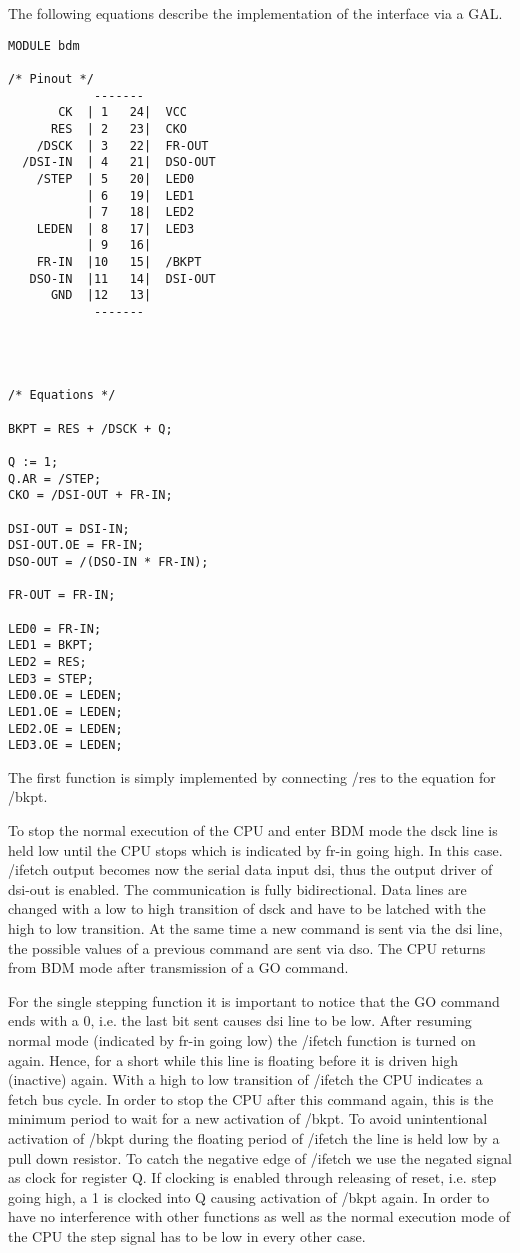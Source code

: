 \documentclass[12pt]{article}
\begin{document}
The following equations describe the implementation of the interface
via a GAL.

\small
\begin{verbatim}
MODULE bdm

/* Pinout */
            -------
       CK  | 1   24|  VCC
      RES  | 2   23|  CKO
    /DSCK  | 3   22|  FR-OUT
  /DSI-IN  | 4   21|  DSO-OUT
    /STEP  | 5   20|  LED0
           | 6   19|  LED1
           | 7   18|  LED2
    LEDEN  | 8   17|  LED3
           | 9   16|
    FR-IN  |10   15|  /BKPT
   DSO-IN  |11   14|  DSI-OUT
      GND  |12   13|
            -------




/* Equations */

BKPT = RES + /DSCK + Q;

Q := 1;
Q.AR = /STEP;
CKO = /DSI-OUT + FR-IN;

DSI-OUT = DSI-IN;
DSI-OUT.OE = FR-IN;
DSO-OUT = /(DSO-IN * FR-IN);

FR-OUT = FR-IN;

LED0 = FR-IN;
LED1 = BKPT;
LED2 = RES;
LED3 = STEP;
LED0.OE = LEDEN;
LED1.OE = LEDEN;
LED2.OE = LEDEN;
LED3.OE = LEDEN;
\end{verbatim}
\normalsize

The first function is simply implemented by connecting {\sc /res} to the
equation for {\sc /bkpt}.

To stop the normal execution of the CPU and enter BDM mode the
{\sc dsck} line is held low until the CPU stops which is indicated by
{\sc fr-in} going high. In this case. {\sc /ifetch} output becomes now
the serial data input {\sc dsi}, thus the output driver of {\sc dsi-out}
is enabled. The communication is fully bidirectional. Data lines are
changed with a low to high transition of {\sc dsck} and have to be
latched with the high to low transition. At the same time a new
command is sent via the {\sc dsi} line, the possible values of a
previous command are sent via {\sc dso}. The CPU returns from BDM mode
after transmission of a GO command.

For the single stepping function it is important to notice that the GO
command ends with a 0, i.e. the last bit sent causes {\sc dsi} line to be
low. After resuming normal mode (indicated by {\sc fr-in} going low) the
{\sc /ifetch} function is turned on again. Hence, for a short while this
line is floating before it is driven high (inactive) again. With a
high to low transition of {\sc /ifetch} the CPU indicates a fetch bus
cycle. In order to stop the CPU after this command again, this is the
minimum period to wait for a new activation of {\sc /bkpt}. To avoid
unintentional activation of {\sc /bkpt} during the floating period of
{\sc /ifetch} the line is held low by a pull down resistor. To catch the
negative edge of {\sc /ifetch} we use the negated signal as clock for
register Q. If clocking is enabled through releasing of reset,
i.e. {\sc step} going high, a 1 is clocked into Q causing activation of
{\sc /bkpt} again. In order to have no interference with other functions as
well as the normal execution mode of the CPU the {\sc step} signal has to be
low in every other case.
\end{document}
